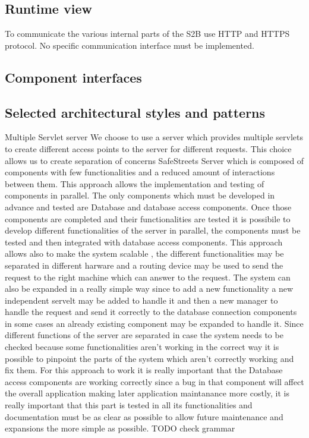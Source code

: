 \subsection{Runtime view}
To communicate the various internal parts of the S2B use HTTP and HTTPS protocol. No specific communication interface must be implemented.
\subsection{Component interfaces}

\subsection{Selected architectural styles and patterns}
Multiple Servlet server
\newline
We choose to use a server which provides multiple servlets to create different access points to the server for different requests. This choice allows us to create separation of concerns SafeStreets Server which is composed of components with few functionalities and a reduced amount of interactions between them. This approach allows the implementation and testing of components in parallel. The only components which must be developed in advance and tested are Database and database access components. Once those components  are completed  and their functionalities are tested it is possibile to develop different functionalities of the server in parallel, the components must be tested and then integrated with database access components. This approach allows also to make the system scalable , the different functionalities may be separated in different harware and a routing device may be used to send the request to the right machine which can answer to the request. The system can also be expanded in a really simple way since to add a new functionality a new independent servelt may be added to handle it and then a new manager to handle the request and send it correctly to the database connection components in some cases an  already existing component may be expanded to handle it.
Since different functions of the server are separated in case the system needs to be checked because some functionalities aren't working in the correct way it is possible to pinpoint the parts of the system which aren't correctly working and fix them. For this approach to work it is really important that the Database access components are working correctly since a bug in that component will affect the overall application making later application maintanance more costly, it is really important that this part is tested in all its functionalities and documentation must be as clear as possible to allow future maintenance and expansions the more simple as possible.
TODO check grammar

